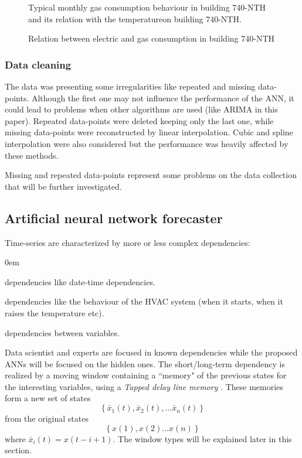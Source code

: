 \documentclass{sig-alternate-sigmod07}
\begin{document}
\begin{figure}[h!]
\centering
{}
\caption{Typical monthly gas consumption behaviour in building 740-NTH and its relation with the temperatureon building 740-NTH.}
\label{fig:monthlyTGas}
\end{figure}

\begin{figure}[h!]
\centering
{}
\caption{Relation between electric and gas consumption in building 740-NTH}
\label{fig:monthlyGasElectr}
\end{figure}


\subsubsection{Data cleaning}
\label{sec:cleaning}
The data was presenting some irregularities like repeated and missing data-points. Although the first one may not influence the performance of the ANN, it could lead to problems when other algorithms are used (like ARIMA in this paper). Repeated data-points were deleted keeping only the last one, while missing data-points were reconstructed by linear interpolation. Cubic and spline interpolation were also considered but the performance was heavily affected by these methods.

Missing and repeated data-points represent some problems on the data collection that will be further investigated.
\vfill

\subsection{Artificial neural network forecaster}
\label{sec:predictor}

Time-series are characterized by more or less complex dependencies:
\begin{description}
\itemsep0em
  \item[Known] dependencies like date-time dependencies.
  \item[Hidden] dependencies like the behaviour of the HVAC system (when it starts, when it raises the temperature etc).
  \item[Short/long-term] dependencies between variables.
\end{description}
Data scientist and experts are focused in known dependencies while the proposed ANNs will be focused on the hidden ones.
The short/long-term dependency is realized by a moving window containing a ``memory" of the previous states for the interesting variables, using a \emph{Tapped delay line memory} \cite{mozer2007neural}. These memories form a new set of states \begin{displaymath}\left\{\bar{x}_1(t), \bar{x}_2(t), \ldots \bar{x}_n(t)\right\}\end{displaymath} from the original states \begin{displaymath}\left\{x(1), x(2) \ldots x(n)\right\}\end{displaymath}where $\bar{x}_i(t) = x(t - i + 1)$. The window types will be explained later in this section. 
\end{document}
